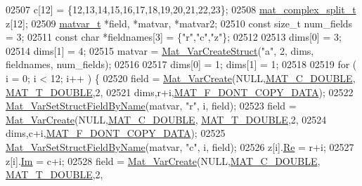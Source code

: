 \begin{DoxyCode}
{{{{{{{{02507               c[12] = \{12,13,14,15,16,17,18,19,20,21,22,23\};
02508     \hyperlink{group___m_a_t_structmat__complex__split__t}{mat\_complex\_split\_t} z[12];
02509     \hyperlink{group___m_a_t_structmatvar__t}{matvar\_t} *field, *matvar, *matvar2;
02510     \textcolor{keyword}{const} \textcolor{keywordtype}{size\_t} num\_fields = 3;
02511     \textcolor{keyword}{const} \textcolor{keywordtype}{char} *fieldnames[3] = \{\textcolor{stringliteral}{"r"},\textcolor{stringliteral}{"c"},\textcolor{stringliteral}{"z"}\};
02512 
02513     dims[0] = 3;
02514     dims[1] = 4;
02515     matvar = \hyperlink{group___m_a_t_gacecdb682a50977e54ecbdc54ed5c31bf}{Mat\_VarCreateStruct}(\textcolor{stringliteral}{"a"}, 2, dims, fieldnames, num\_fields);
02516 
02517     dims[0] = 1; dims[1] = 1;
02518 
02519     \textcolor{keywordflow}{for} ( i = 0; i < 12; i++ ) \{
02520         field = \hyperlink{group___m_a_t_ga1c54a84bb4d810c6fccdb8869489eac4}{Mat\_VarCreate}(NULL,\hyperlink{group___m_a_t_ggad4d60ae7b709fc81bfd744fb4c857c40a5d70e0862e5bdb7bd86bf7ba5948f307}{MAT\_C\_DOUBLE},
      \hyperlink{group___m_a_t_ggacf7b3b879282b7ab3a51190e49bf3453a31e721ecf7e188196f83c32838288797}{MAT\_T\_DOUBLE},2,
02521                               dims,r+i,\hyperlink{group___m_a_t_ggab9d6ef9e3ddca78a317b173f01d53fbba762244499f52eb35e7b53fb79a1f2889}{MAT\_F\_DONT\_COPY\_DATA});
02522         \hyperlink{group___m_a_t_ga702f2b853c605c94a8af50555fc7183b}{Mat\_VarSetStructFieldByName}(matvar, \textcolor{stringliteral}{"r"}, i, field);
02523         field = \hyperlink{group___m_a_t_ga1c54a84bb4d810c6fccdb8869489eac4}{Mat\_VarCreate}(NULL,\hyperlink{group___m_a_t_ggad4d60ae7b709fc81bfd744fb4c857c40a5d70e0862e5bdb7bd86bf7ba5948f307}{MAT\_C\_DOUBLE},
      \hyperlink{group___m_a_t_ggacf7b3b879282b7ab3a51190e49bf3453a31e721ecf7e188196f83c32838288797}{MAT\_T\_DOUBLE},2,
02524                               dims,c+i,\hyperlink{group___m_a_t_ggab9d6ef9e3ddca78a317b173f01d53fbba762244499f52eb35e7b53fb79a1f2889}{MAT\_F\_DONT\_COPY\_DATA});
02525         \hyperlink{group___m_a_t_ga702f2b853c605c94a8af50555fc7183b}{Mat\_VarSetStructFieldByName}(matvar, \textcolor{stringliteral}{"c"}, i, field);
02526         z[i].\hyperlink{group___m_a_t_a484a93607508adac2bce53a0252e0325}{Re} = r+i;
02527         z[i].\hyperlink{group___m_a_t_a7182d10b0d3598415887376065440946}{Im} = c+i;
02528         field = \hyperlink{group___m_a_t_ga1c54a84bb4d810c6fccdb8869489eac4}{Mat\_VarCreate}(NULL,\hyperlink{group___m_a_t_ggad4d60ae7b709fc81bfd744fb4c857c40a5d70e0862e5bdb7bd86bf7ba5948f307}{MAT\_C\_DOUBLE},
      \hyperlink{group___m_a_t_ggacf7b3b879282b7ab3a51190e49bf3453a31e721ecf7e188196f83c32838288797}{MAT\_T\_DOUBLE},2,
}}}}}}}}
\end{DoxyCode}
